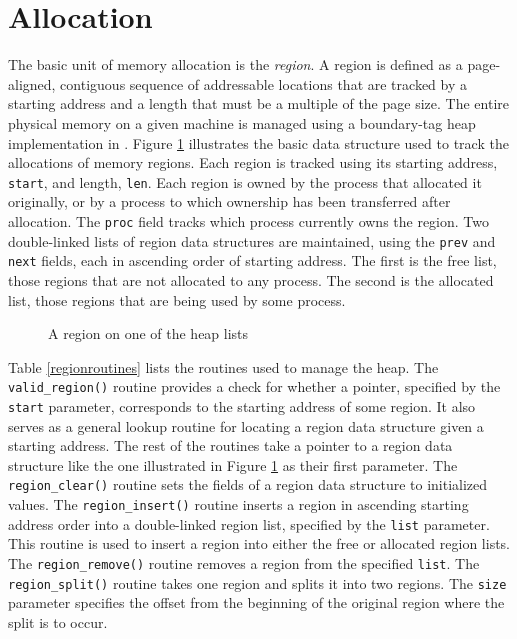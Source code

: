 \section{Allocation}

The basic unit of memory allocation is the {\em region}.
A region is defined as a page-aligned, contiguous sequence
of addressable locations that are tracked by a starting address
and a length that must be a multiple of the page size.  The
entire physical memory on a given machine is managed using
a boundary-tag heap implementation in \roadrunner.  Figure
\ref{region} illustrates the basic data structure used to
track the allocations of memory regions.  Each region is
tracked using its starting address, {\tt start}, and length,
{\tt len}.  Each region is owned by the process that allocated
it originally, or by a process to which ownership has been
transferred after allocation.  The {\tt proc} field tracks
which process currently owns the region.  Two double-linked
lists of region data structures are maintained, using the
{\tt prev} and {\tt next} fields, each in ascending order
of starting address.  The first is the free list, those
regions that are not allocated to any process.  The second
is the allocated list, those regions that are being used
by some process.

\begin{center}\begin{figure}[h]
\centerline{}
\caption{\label{region} A region on one of the heap lists}
\end{figure}\end{center}

Table \ref{regionroutines} lists the routines used to manage
the heap.  The {\tt valid\_region()} routine provides a check
for whether a pointer, specified by the {\tt start} parameter,
corresponds to the starting address of some region.  It also
serves as a general lookup routine for locating a region data
structure given a starting address.  The rest of the routines
take a pointer to a region data structure like the one
illustrated in Figure \ref{region} as their first parameter.
The {\tt region\_clear()} routine sets the fields of a region
data structure to initialized values.  The {\tt region\_insert()}
routine inserts a region in ascending starting address order
into a double-linked region list, specified by the {\tt list}
parameter.  This routine is used to insert a region into either
the free or allocated region lists.  The {\tt region\_remove()}
routine removes a region from the specified {\tt list}.  The
{\tt region\_split()} routine takes one region and splits it
into two regions.  The {\tt size} parameter specifies the
offset from the beginning of the original region where the
split is to occur.

